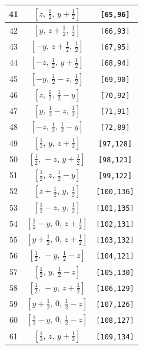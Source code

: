 \documentclass[fleqn,8pt]{jsarticle}
\begin{document}
\begin{longtable}{ccc}
41 & $\left[ z,\, \frac{1}{2},\, y + \frac{1}{2} \right]$ & {\tt [65,96]} \\ \hline
42 & $\left[ y,\, z + \frac{1}{2},\, \frac{1}{2} \right]$ & {\tt [66,93]} \\ \hline
43 & $\left[ - y,\, z + \frac{1}{2},\, \frac{1}{2} \right]$ & {\tt [67,95]} \\ \hline
44 & $\left[ - z,\, \frac{1}{2},\, y + \frac{1}{2} \right]$ & {\tt [68,94]} \\ \hline
45 & $\left[ - y,\, \frac{1}{2} - z,\, \frac{1}{2} \right]$ & {\tt [69,90]} \\ \hline
46 & $\left[ z,\, \frac{1}{2},\, \frac{1}{2} - y \right]$ & {\tt [70,92]} \\ \hline
47 & $\left[ y,\, \frac{1}{2} - z,\, \frac{1}{2} \right]$ & {\tt [71,91]} \\ \hline
48 & $\left[ - z,\, \frac{1}{2},\, \frac{1}{2} - y \right]$ & {\tt [72,89]} \\ \hline
49 & $\left[ \frac{1}{2},\, y,\, z + \frac{1}{2} \right]$ & {\tt [97,128]} \\ \hline
50 & $\left[ \frac{1}{2},\, - z,\, y + \frac{1}{2} \right]$ & {\tt [98,123]} \\ \hline
51 & $\left[ \frac{1}{2},\, z,\, \frac{1}{2} - y \right]$ & {\tt [99,122]} \\ \hline
52 & $\left[ z + \frac{1}{2},\, y,\, \frac{1}{2} \right]$ & {\tt [100,136]} \\ \hline
53 & $\left[ \frac{1}{2} - z,\, y,\, \frac{1}{2} \right]$ & {\tt [101,135]} \\ \hline
54 & $\left[ \frac{1}{2} - y,\, 0,\, z + \frac{1}{2} \right]$ & {\tt [102,131]} \\ \hline
55 & $\left[ y + \frac{1}{2},\, 0,\, z + \frac{1}{2} \right]$ & {\tt [103,132]} \\ \hline
56 & $\left[ \frac{1}{2},\, - y,\, \frac{1}{2} - z \right]$ & {\tt [104,121]} \\ \hline
57 & $\left[ \frac{1}{2},\, y,\, \frac{1}{2} - z \right]$ & {\tt [105,130]} \\ \hline
58 & $\left[ \frac{1}{2},\, - y,\, z + \frac{1}{2} \right]$ & {\tt [106,129]} \\ \hline
59 & $\left[ y + \frac{1}{2},\, 0,\, \frac{1}{2} - z \right]$ & {\tt [107,126]} \\ \hline
60 & $\left[ \frac{1}{2} - y,\, 0,\, \frac{1}{2} - z \right]$ & {\tt [108,127]} \\ \hline
61 & $\left[ \frac{1}{2},\, z,\, y + \frac{1}{2} \right]$ & {\tt [109,134]} \\ \hline

\end{longtable}
\end{document}
